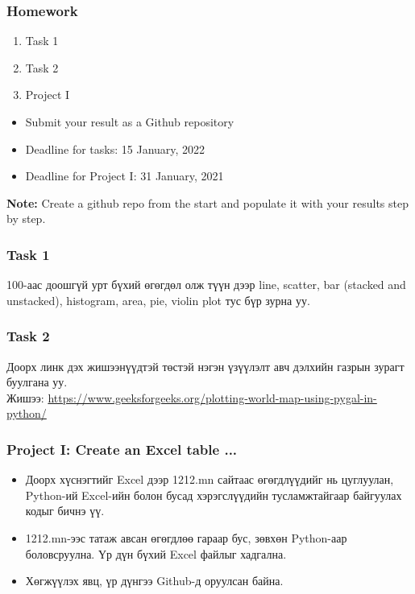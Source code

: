 \documentclass{beamer}
\begin{document}
\begin{frame}
    \frametitle{Homework}
    \begin{enumerate}
        \item Task 1
        \item Task 2
        \item Project I
    \end{enumerate}

    \vskip 2mm
    \begin{itemize}
        \item Submit your result as a Github repository
        \item Deadline for tasks: 15 January, 2022
        \item Deadline for Project I: 31 January, 2021 \\
    \end{itemize}

\vfill
\textbf{Note:} Create a github repo from the start and populate it with your results step by step.

\end{frame}

\begin{frame}
    \frametitle{Task 1}
    100-аас доошгүй урт бүхий өгөгдөл олж түүн дээр 
    line, scatter, bar (stacked and unstacked), histogram,
    area, pie, violin plot тус бүр зурна уу.
\end{frame}

\begin{frame}
    \frametitle{Task 2}
    Доорх линк дэх жишээнүүдтэй төстэй нэгэн үзүүлэлт
    авч дэлхийн газрын зурагт буулгана уу. \\
    Жишээ:
	\url{https://www.geeksforgeeks.org/plotting-world-map-using-pygal-in-python/}
\end{frame}

\begin{frame}
    \frametitle{Project I: Create an Excel table ...}
    \begin{itemize}
        \item Доорх хүснэгтийг Excel дээр 1212.mn сайтаас өгөгдлүүдийг нь цуглуулан, 
        Python-ий Excel-ийн болон бусад хэрэгслүүдийн тусламжтайгаар 
        байгуулах кодыг бичнэ үү. 
        \item 1212.mn-ээс татаж авсан өгөгдлөө гараар бус, зөвхөн Python-аар
        боловсруулна. Үр дүн бүхий Excel файлыг хадгална.
        \item Хөгжүүлэх явц, үр дүнгээ Github-д оруулсан байна.        
    \end{itemize}

\end{frame}
\end{document}
